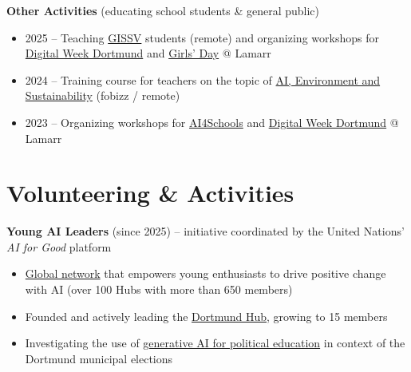 \documentclass[12pt]{letter}
\begin{document}
\textbf{Other Activities} (educating school students \& general public)\\[-1.5em]
{\footnotesize \begin{itemize}[leftmargin=1.2em,noitemsep,topsep=0pt]
  \item[] 2025 -- Teaching \href{https://www.linkedin.com/posts/german-international-school-of-silicon-valley_ai-ki-aiweek-activity-7419934687802064896-hY7S}{GISSV} students (remote) and organizing workshops for \href{https://www.diwodo.de/events/nachhaltigkeit-im-zeitalter-kunstlicher-intelligenz-7624b277-a97b-47b0-a4e0-58097e4eb080/}{Digital Week Dortmund} and \href{https://lamarr-institute.org/news/girls-day-2025/}{Girls' Day} @ Lamarr
  \item[] 2024 -- Training course for teachers on the topic of   \href{https://app.fobizz.com/fortbildungen/2236-ki-fokus-umwelt-und-nachhaltigkeit/}{AI, Environment and Sustainability} (fobizz / remote) 
  \item[] 2023 -- Organizing workshops for \href{https://lamarr-institute.org/news/ai4schools-workshop-des-lamarr-instituts/}{AI4Schools} and \href{https://lamarr-institute.org/news/diwodo-2023-regional-and-international-interest-in-lamarr-institute-ai-research/}{Digital Week Dortmund} @ Lamarr
\end{itemize}}








\section{Volunteering \& Activities}

\textbf{Young AI Leaders} (since 2025) -- initiative coordinated by the United Nations' \emph{AI for Good} platform
{\footnotesize
\begin{itemize}[leftmargin=1.2em,noitemsep,topsep=0pt]
    \item \href{https://aiforgood.itu.int/young-ai-leaders-community/}{Global network} that empowers young enthusiasts to drive positive change with AI (over 100 Hubs with more than 650 members)
    \item Founded and actively leading the \href{https://youngaileaders-dortmund.de/}{Dortmund Hub}, growing to 15 members
    \item Investigating the use of \href{https://dortmund-wahl-ki.de/}{generative AI for political education} in context of the Dortmund municipal elections
\end{itemize}}
\end{document}
